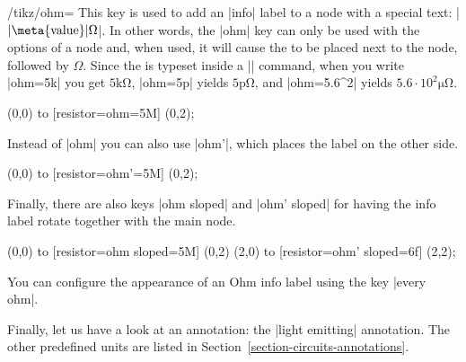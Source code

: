 \begin{key}{/tikz/ohm=}
    This key is used to add an |info| label to a node with a special text:
    |$\mathrm{|\meta{value}|\Omega}$|. In other words, the |ohm| key can only
    be used with the options of a node and, when used, it will cause the
     to be placed next to the node, followed by $\Omega$. Since the
     is typeset inside a |\mathrm| command, when you write |ohm=5k|
    you get $\mathrm{5k\Omega}$, |ohm=5p| yields $\mathrm{5p\Omega}$, and
    |ohm=5.6^{2}\mu| yields $\mathrm{5.6\cdot 10^{2}\mu\Omega}$.
\begin{codeexample}[preamble={\usetikzlibrary{circuits.ee.IEC}}]
 \draw (0,0) to [resistor={ohm=5M}] (0,2);
\end{codeexample}

    Instead of |ohm| you can also use |ohm'|, which places the label on the
    other side.
\begin{codeexample}[preamble={\usetikzlibrary{circuits.ee.IEC}}]
 \draw (0,0) to [resistor={ohm'=5M}] (0,2);
\end{codeexample}

    Finally, there are also keys |ohm sloped| and |ohm' sloped| for having the
    info label rotate together with the main node.
\begin{codeexample}[preamble={\usetikzlibrary{circuits.ee.IEC}}]
  \draw (0,0) to [resistor={ohm sloped=5M}] (0,2)
        (2,0) to [resistor={ohm' sloped=6f}]  (2,2);
\end{codeexample}

    You can configure the appearance of an Ohm info label using the key
    |every ohm|.
\end{key}

Finally, let us have a look at an annotation: the |light emitting| annotation.
The other predefined units are listed in
Section~\ref{section-circuits-annotations}.

